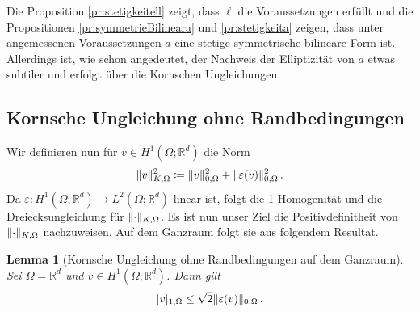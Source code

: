 \documentclass{scrartcl}
\newcounter{everything}
\newtheorem{lemma}[everything]{Lemma}
\def\R{\mathbb{R}}
\def\e{\varepsilon}
\DeclarePairedDelimiter{\abs}{\lvert}{\rvert}
\DeclarePairedDelimiter{\norm}{\lVert}{\rVert}
\begin{document}
Die Proposition \ref{pr:stetigkeitell} zeigt, dass $\ell$ die Voraussetzungen erfüllt und die Propositionen \ref{pr:symmetrieBilineara} und \ref{pr:stetigkeita} zeigen, dass unter angemessenen Voraussetzungen $a$ eine stetige symmetrische bilineare Form ist.
Allerdings ist, wie schon angedeutet, der Nachweis der Elliptizität von $a$ etwas subtiler und erfolgt über die Kornschen Ungleichungen.

\subsection{Kornsche Ungleichung ohne Randbedingungen}

Wir definieren nun für $v\in H^1(\Omega;\R^d)$ die Norm
\begin{align}
	\norm{v}_{K,\Omega}^2\coloneqq \norm{v}_{0,\Omega}^2+\norm{\e(v)}_{0,\Omega}^2\,.
	\label{eq:DefinitionKornNorm}
\end{align}
Da $\e\colon H^1(\Omega;\R^d)\to L^2(\Omega;\R^d)$ linear ist, folgt die 1-Homogenität und die Dreiecksun\-gleichung für $\norm{\cdot}_{K,\Omega}$. Es ist nun unser Ziel die Positivdefinitheit von $\norm{\cdot}_{K,\Omega}$ nachzuweisen. Auf dem Ganzraum folgt sie aus folgendem Resultat.
\begin{lemma}[Kornsche Ungleichung ohne Randbedingungen auf dem Ganzraum]\label{le:KornOhneRandbedingungenAufGanzraum}
	Sei $\Omega=\R^d$ und $v\in H^1(\Omega;\R^d)$. Dann gilt
	\begin{align*}
		\abs{v}_{1,\Omega}\leq \sqrt{2}\norm{\e(v)}_{0,\Omega}\,.
	\end{align*}
\end{lemma}
\end{document}
